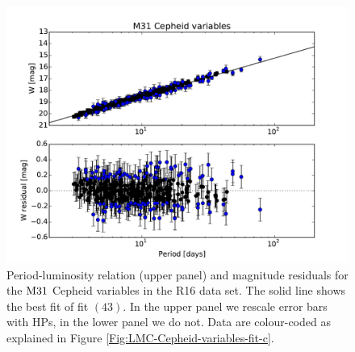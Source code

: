 \begin{figure}[hbtp]
\centering
\includegraphics[width=\textwidth]{figures/chapter-h0/effective_HP_cepheids_M31_R16.pdf}
\caption{Period-luminosity relation (upper panel) and magnitude residuals for the $\mathrm{M31}$ Cepheid variables in the R16 data set. The solid line shows the best fit of fit $(43)$. In the upper panel we rescale error bars with HPs, in the lower panel we do not. Data are colour-coded as explained in Figure \ref{Fig:LMC-Cepheid-variables-fit-c}.}
\label{Fig:R16-M31}
\end{figure}

